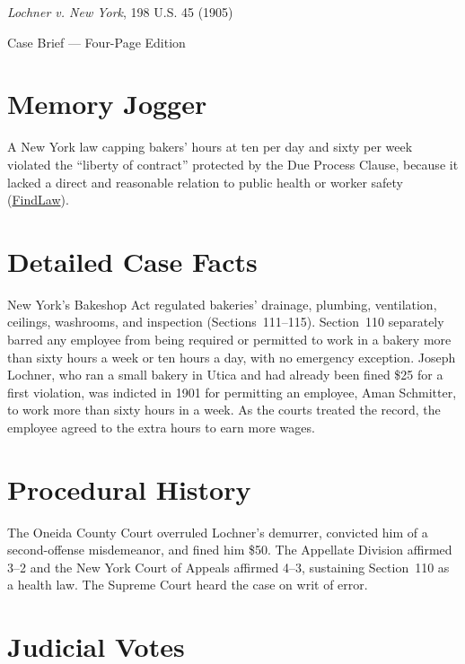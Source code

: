 \documentclass[12pt]{article}
\begin{document}
\begin{center}
{\LARGE \textit{Lochner v. New York}, 198 U.S. 45 (1905)\par}
\vspace{0.8em}
{\large Case Brief --- Four-Page Edition\par}
\end{center}
\vspace{1em}

\section{Memory Jogger}

A New York law capping bakers' hours at ten per day and sixty per week violated the ``liberty of contract'' protected by the Due Process Clause, because it lacked a direct and reasonable relation to public health or worker safety (\href{https://caselaw.findlaw.com/court/us-supreme-court/198/45.html}{FindLaw}).

\section{Detailed Case Facts}

New York's Bakeshop Act regulated bakeries' drainage, plumbing, ventilation, ceilings, washrooms, and inspection (Sections~111--115). Section~110 separately barred any employee from being required or permitted to work in a bakery more than sixty hours a week or ten hours a day, with no emergency exception. Joseph Lochner, who ran a small bakery in Utica and had already been fined \$25 for a first violation, was indicted in 1901 for permitting an employee, Aman Schmitter, to work more than sixty hours in a week. As the courts treated the record, the employee agreed to the extra hours to earn more wages.

\section{Procedural History}

The Oneida County Court overruled Lochner's demurrer, convicted him of a second-offense misdemeanor, and fined him \$50. The Appellate Division affirmed 3--2 and the New York Court of Appeals affirmed 4--3, sustaining Section~110 as a health law. The Supreme Court heard the case on writ of error.

\section{Judicial Votes}
\end{document}
